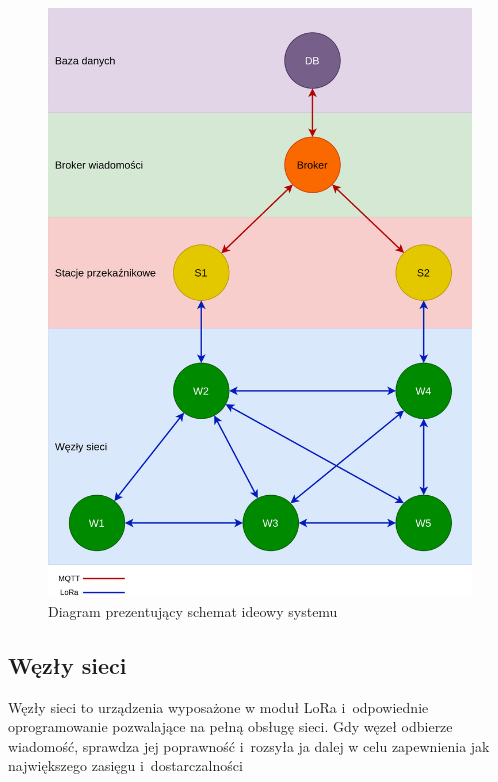 \begin{figure}[p!]
    \begin{center}
        \includegraphics[width=15cm]{pic/diagram-systemu.png}
    \end{center}
    \caption{Diagram prezentujący schemat ideowy systemu}\label{rys:system-diagram}
\end{figure}

\subsection{Węzły sieci}
Węzły sieci to urządzenia wyposażone w moduł LoRa i~odpowiednie oprogramowanie pozwalające na pełną obsługę sieci.
Gdy węzeł odbierze wiadomość, sprawdza jej poprawność i~rozsyła ja dalej w celu zapewnienia jak największego zasięgu i~dostarczalności

